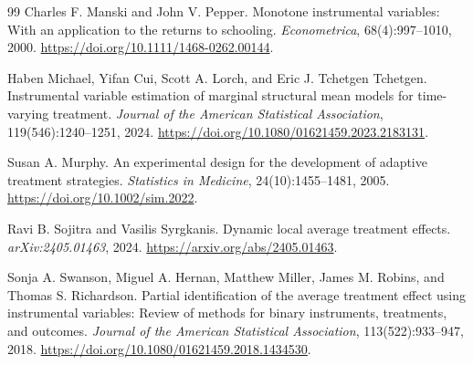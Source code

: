 \documentclass[11pt]{article}
\theoremstyle{definition}
\theoremstyle{plain}
\theoremstyle{remark}
\begin{document}
\begin{thebibliography}{99}
Charles F. Manski and John V. Pepper.
\newblock Monotone instrumental variables: With an application to the returns to schooling.
\newblock \emph{Econometrica}, 68(4):997--1010, 2000.
\newblock \url{https://doi.org/10.1111/1468-0262.00144}.

Haben Michael, Yifan Cui, Scott A. Lorch, and Eric J. Tchetgen Tchetgen.
\newblock Instrumental variable estimation of marginal structural mean models for time-varying treatment.
\newblock \emph{Journal of the American Statistical Association}, 119(546):1240--1251, 2024.
\newblock \url{https://doi.org/10.1080/01621459.2023.2183131}.

Susan A. Murphy.
\newblock An experimental design for the development of adaptive treatment strategies.
\newblock \emph{Statistics in Medicine}, 24(10):1455--1481, 2005.
\newblock \url{https://doi.org/10.1002/sim.2022}.

Ravi B. Sojitra and Vasilis Syrgkanis.
\newblock Dynamic local average treatment effects.
\newblock \emph{arXiv:2405.01463}, 2024.
\newblock \url{https://arxiv.org/abs/2405.01463}.

Sonja A. Swanson, Miguel A. Hernan, Matthew Miller, James M. Robins, and Thomas S. Richardson.
\newblock Partial identification of the average treatment effect using instrumental variables: Review of methods for binary instruments, treatments, and outcomes.
\newblock \emph{Journal of the American Statistical Association}, 113(522):933--947, 2018.
\newblock \url{https://doi.org/10.1080/01621459.2018.1434530}.

\end{thebibliography}
\end{document}
